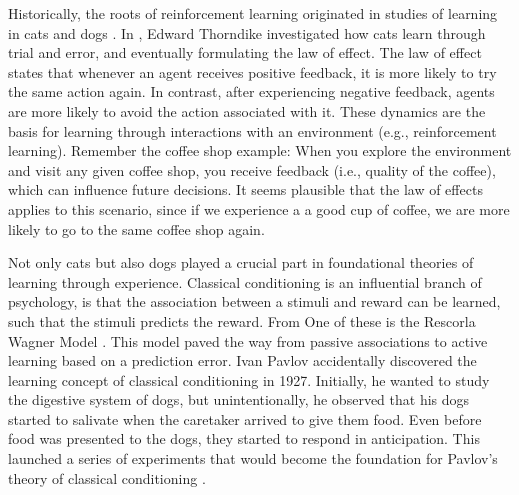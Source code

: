Historically, the roots of reinforcement learning originated in studies of learning in cats \citep{thorndike1927law} and dogs \citep{pavlov1927conditional}.
In \citeyear{thorndike1927law}, Edward Thorndike investigated how cats learn through trial and error, and eventually formulating the law of effect.
The law of effect states that whenever an agent receives positive feedback, it is more likely to try the same action again. In contrast, after experiencing negative feedback, agents are more likely to avoid the action associated with it.
These dynamics are the basis for learning through interactions with an environment (e.g., reinforcement learning). Remember the coffee shop example: When you explore the environment and visit any given coffee shop, you receive feedback (i.e., quality of the coffee), which can influence future decisions. It seems plausible that the law of effects applies to this scenario, since if we experience a a good cup of coffee, we are more likely to go to the same coffee shop again. 

Not only cats but also dogs played a crucial part in foundational theories of learning through experience. 
Classical conditioning is an influential branch of psychology,  is that the association between a stimuli and reward can be learned, such that the stimuli predicts the reward. %
From One of these is the Rescorla Wagner Model \citep{rescorla1972theory}. This model paved the way from passive associations to active learning based on a prediction error.
Ivan Pavlov accidentally discovered the learning concept of classical conditioning in 1927. Initially, he wanted to study the digestive system of dogs, but unintentionally, he observed that his dogs started to salivate when the caretaker arrived to give them food. Even before food was presented to the dogs, they started to respond in anticipation. This launched a series of experiments that would become the foundation for Pavlov's theory of classical conditioning \citep{pavlov1927conditional}.  


